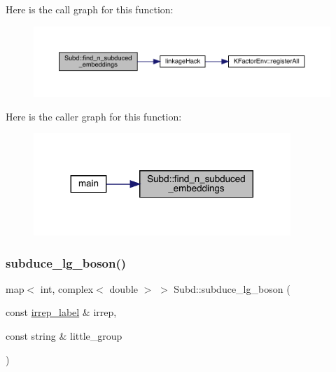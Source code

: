 Here is the call graph for this function\+:
\nopagebreak
\begin{figure}[H]
\begin{center}
\leavevmode
\includegraphics[width=350pt]{d8/d2b/namespaceSubd_a7a3fcd97f1cf40eb963e278240d0ff3e_cgraph}
\end{center}
\end{figure}
Here is the caller graph for this function\+:
\nopagebreak
\begin{figure}[H]
\begin{center}
\leavevmode
\includegraphics[width=275pt]{d8/d2b/namespaceSubd_a7a3fcd97f1cf40eb963e278240d0ff3e_icgraph}
\end{center}
\end{figure}
\mbox{\label{namespaceSubd_a5f31b3ef70ad25320a8010ec3017eb04}} 
\subsubsection{\texorpdfstring{subduce\_lg\_boson()}{subduce\_lg\_boson()}}
{\footnotesize\ttfamily map$<$ int, complex$<$ double $>$ $>$ Subd\+::subduce\+\_\+lg\+\_\+boson (\begin{DoxyParamCaption}\item[{const \mbox{\hyperlink{structirrep__label}{irrep\+\_\+label}} \&}]{irrep,  }\item[{const string \&}]{little\+\_\+group }\end{DoxyParamCaption})}

